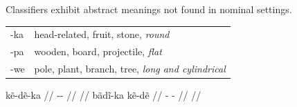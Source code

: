 \documentclass{beamer}
\begin{document}
  

\begin{frame}{Classifiers exhibit abstract meanings not found in nominal settings.}
  
  \begin{tabular}{ll}
    -ka & head-related, fruit, stone, \emph{round} \\
    -pa & wooden, board, projectile, \emph{flat} \\
    -we & pole, plant, branch, tree, \emph{long and cylindrical} \\
  \end{tabular}

  \pex
  \a\judge{\#/*}\begingl
  \gla kẽ-dẽ-ka //
  \glb {}-- //
  \glft {} //
  \endgl
  \a\begingl
  \gla bãdĩ-ka kẽ-dẽ //
  \glb {}- - //
  \glft {} //
  \endgl
  \xe

\end{frame}

  



\end{document}
